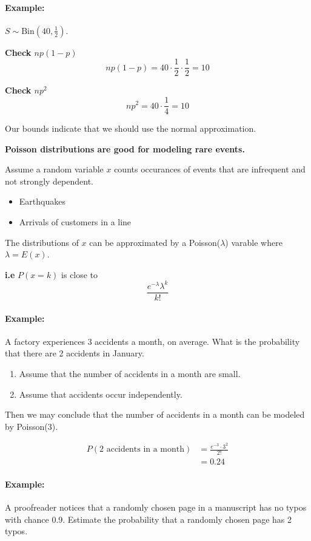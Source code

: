 \documentclass[letterpaper,12pt]{article}
\begin{document}
\paragraph{Example:} $S \sim \mathrm{Bin}(40,\frac{1}{2})$.


\textbf{Check $np(1-p)$} 
\[
    np(1-p) = 40 \cdot \frac{1}{2} \cdot \frac{1}{2} = 10
\]


\textbf{Check $np^2$}
\[
    np^2 = 40 \cdot \frac{1}{4} = 10
\]


Our bounds indicate that we should use the normal approximation.


\textbf{Poisson distributions are good for modeling rare events.} 


Assume a random variable $x$ counts occurances of events that are infrequent and not strongly
dependent.
\begin{itemize}
    \item Earthquakes
    \item Arrivals of customers in a line
\end{itemize}


The distributions of $x$ can be approximated by a Poisson($\lambda$) varable where
$\lambda = E(x)$.


\textbf{i.e} $P(x = k)$ is close to $$\frac{e^{-\lambda}\lambda^k}{k!}$$


\paragraph{Example:}A factory experiences 3 accidents a month, on average. What is the probability
that there are 2 accidents in January.


\begin{enumerate}
    \item Assume that the number of accidents in a month are small.
    \item Assume that accidents occur independently.
\end{enumerate}


Then we may conclude that the number of accidents in a month can be modeled by Poisson(3).


\begin{align*}
P(\text{2 accidents in a month}) &= \frac{e^{-3}\cdot 3^{2}}{2!}\\
                                 &= 0.24
\end{align*}


\paragraph{Example:} A proofreader notices that a randomly chosen page in a manuscript has no typos with
chance 0.9. Estimate the probability that a randomly chosen page has 2 typos.
\end{document}
